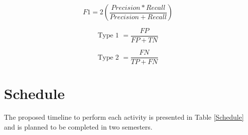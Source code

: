 \documentclass[journal]{IEEEtai}
\begin{document}
\begin{equation}
F1 = 2	\left( \frac{Precision*Recall}{Precision + Recall} \right)
\end{equation}


\begin{equation}
\text{Type 1 } = \frac{FP}{FP + TN}
\end{equation}


\begin{equation}
\text{Type 2 } = \frac{FN}{TP + FN}
\end{equation}



\section{Schedule}
The proposed timeline to perform each activity is presented in Table \ref{Schedule}  and is planned to be completed in two semesters.
\end{document}

